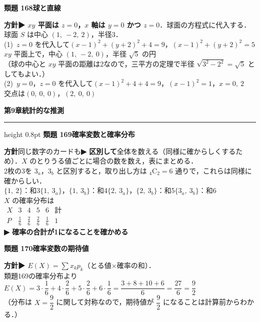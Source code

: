 \documentclass[a4paper,11pt]{ltjsarticle}
\newcommand{\ans}[2]{\Needspace{5\baselineskip}\vspace{6pt}%
  {\sffamily\bfseries 類題 #1\quad #2}\par}
\newcommand{\point}[1]{\textsf{\bfseries ▶ #1}}
\newcommand{\shouans}[2]{\Needspace{8\baselineskip}\vspace{10pt}\markboth{解答\quad #1\quad #2}{}%
  {\sffamily\bfseries\Large #1\quad #2\par}\vspace{2pt}\hrule height 0.8pt\vspace{2pt}}
\begin{document}
\ans{168}{球と直線}
\begin{kai}
\textbf{方針}\quad \point{$xy$ 平面は $z=0$，$x$ 軸は $y=0$ かつ $z=0$}．球面の方程式に代入する．\\[2pt]
球面 $S$ は中心 $(1,\ -2,\ 2)$，半径3．\\[2pt]
(1)\ $z=0$ を代入して\quad $(x-1)^2+(y+2)^2+4=9$，\quad $(x-1)^2+(y+2)^2=5$\\
\hspace*{1.5em}$xy$ 平面上で，中心 $(1,\ -2,\ 0)$，半径 $\sqrt5$ の円\\
\hspace*{1.5em}（球の中心と $xy$ 平面の距離は2なので，三平方の定理で半径 $\sqrt{3^2-2^2}=\sqrt5$ としてもよい．）\\[2pt]
(2)\ $y=0$，$z=0$ を代入して\quad $(x-1)^2+4+4=9$，\quad $(x-1)^2=1$，\quad $x=0,\ 2$\\
\hspace*{1.5em}交点は\quad $(0,\ 0,\ 0)$，\quad $(2,\ 0,\ 0)$
\end{kai}

\shouans{第9章}{統計的な推測}
\ans{169}{確率変数と確率分布}
\begin{kai}
\textbf{方針}\quad 同じ数字のカードも\point{区別して}全体を数える（同様に確からしくするため）．$X$ のとりうる値ごとに場合の数を数え，表にまとめる．\\[2pt]
2枚の3を $3_a$，$3_b$ と区別すると，取り出し方は ${}_4\mathrm C_2=6$ 通りで，これらは同様に確からしい．\\
\hspace*{1.5em}$\{1,\ 2\}$：和3\qquad $\{1,\ 3_a\}$，$\{1,\ 3_b\}$：和4\qquad $\{2,\ 3_a\}$，$\{2,\ 3_b\}$：和5\qquad $\{3_a,\ 3_b\}$：和6\\[2pt]
$X$ の確率分布は\\[2pt]
\hspace*{1.5em}$\begin{array}{c|cccc|c}X&3&4&5&6&\text{計}\\ \hline P&\frac16&\frac26&\frac26&\frac16&1\end{array}$\\[4pt]
\point{確率の合計が1になることを確かめる}
\end{kai}

\ans{170}{確率変数の期待値}
\begin{kai}
\textbf{方針}\quad \point{$E(X)=\sum x_kp_k$}（とる値×確率の和）．\\[2pt]
類題169の確率分布より\\
\hspace*{1.5em}$E(X)=3\cdot\dfrac16+4\cdot\dfrac26+5\cdot\dfrac26+6\cdot\dfrac16=\dfrac{3+8+10+6}6=\dfrac{27}6=\dfrac92$\\
（分布は $X=\dfrac92$ に関して対称なので，期待値が $\dfrac92$ になることは計算前からわかる．）
\end{kai}
\end{document}

